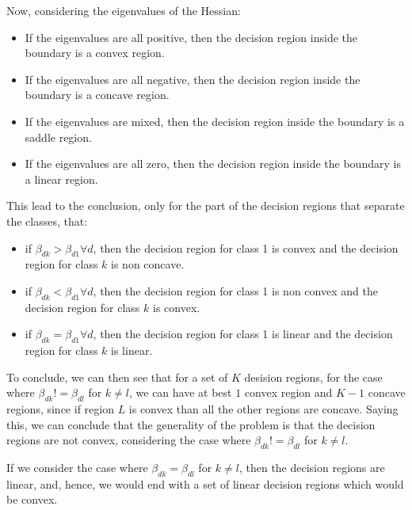 \documentclass[12pt,a4paper,oneside]{paper}
\begin{document}
Now, considering the eigenvalues of the Hessian:

\begin{itemize}
    \setlength{\itemsep}{0pt} %
    \setlength{\parskip}{0pt} %
    \setlength{\leftskip}{15pt} %
    \item If the eigenvalues are all positive, then the decision region inside the boundary is a convex region. 
    \item If the eigenvalues are all negative, then the decision region inside the boundary is a concave region.
    \item If the eigenvalues are mixed, then the decision region inside the boundary is a saddle region.
    \item If the eigenvalues are all zero, then the decision region inside the boundary is a linear region.
\end{itemize}

This lead to the conclusion, only for the part of the decision regions that separate the classes, that: 
\begin{itemize}
    \setlength{\itemsep}{0pt} %
    \setlength{\parskip}{0pt} %
    \setlength{\leftskip}{15pt} %
    \item if $\beta_{dk} > \beta_{d1} \forall d$, then the decision region for class 1 is convex and the decision region for class $k$ is non concave.
    \item if $\beta_{dk} < \beta_{d1} \forall d$, then the decision region for class 1 is non convex and the decision region for class $k$ is convex.
    \item if $\beta_{dk} = \beta_{d1} \forall d$, then the decision region for class 1 is linear and the decision region for class $k$ is linear.
\end{itemize}

To conclude, we can then see that for a set of $K$ desision regions, for the case where $\beta_{dk} != \beta_{dl}$ for $k \neq l$, 
we can have at best $1$ convex region and $K - 1$ concave regions, since if region $L$ is convex than all the other regions are concave.
Saying this, we can conclude that the generality of the problem is that the decision regions are not convex, considering the case where $\beta_{dk} != \beta_{dl}$ for $k \neq l$.

If we consider the case where $\beta_{dk} = \beta_{dl}$ for $k \neq l$, then the decision regions are linear,
and, hence, we would end with a set of linear decision regions which would be convex.
\end{document}
